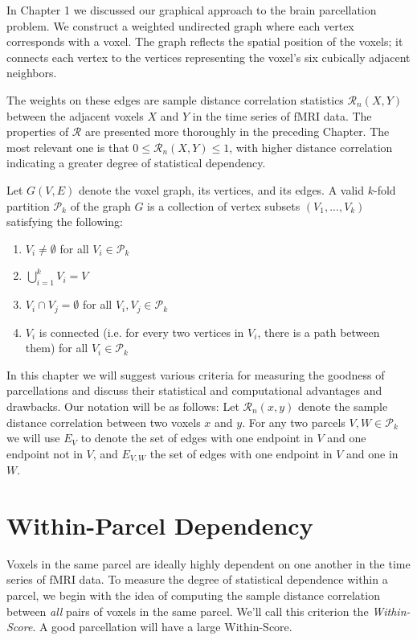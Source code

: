 In Chapter 1 we discussed our graphical approach to the brain
parcellation problem. We construct a weighted undirected graph where
each vertex corresponds with a voxel. The graph reflects the spatial
position of the voxels; it connects each vertex to the vertices
representing the voxel's six cubically adjacent neighbors.

The weights on these edges are sample distance correlation statistics
$\mathcal{R}_n(X,Y)$ between the adjacent voxels $X$ and $Y$ in the
time series of fMRI data. The properties of $\mathcal{R}$ are presented
more thoroughly in the preceding Chapter. The most relevant one is that
$0 \leq \mathcal{R}_n(X,Y) \leq 1$, with higher distance correlation
indicating a greater degree of statistical dependency.

Let $G(V, E)$ denote the voxel graph, its vertices, and its edges.
A valid $k$-fold partition $\mathcal{P}_k$ of the graph $G$ is a
collection of vertex subsets $(V_1, ..., V_k)$ satisfying the following:

\begin{enumerate}[1.]
\item
$V_i \neq \emptyset$ for all $V_i \in \mathcal{P}_k$

\item
$\bigcup\limits_{i=1}^k V_i = V$

\item
$V_i \cap V_j = \emptyset$ for all $V_i, V_j \in \mathcal{P}_k$

\item
$V_i$ is connected (i.e. for every two vertices in $V_i$, there is a
path between them) for all $V_i \in \mathcal{P}_k$
\end{enumerate}

In this chapter we will suggest various criteria for measuring the
goodness of parcellations and discuss their statistical and
computational advantages and drawbacks. Our notation will be as follows:
Let $\mathcal{R}_n(x,y)$ denote the sample distance correlation between
two voxels $x$ and $y$. For any two parcels $V, W \in \mathcal{P}_k$ we
will use $E_V$ to denote the set of edges with one endpoint in $V$ and
one endpoint not in $V$, and $E_{V,W}$ the set of edges with one
endpoint in $V$ and one in $W$.

\section{Within-Parcel Dependency}

Voxels in the same parcel are ideally highly dependent on one another in
the time series of fMRI data. To measure the degree of statistical
dependence within a parcel, we begin with the idea of computing the
sample distance correlation between \textit{all} pairs of voxels in the
same parcel. We'll call this criterion the \textit{Within-Score}.
A good parcellation will have a large Within-Score.

